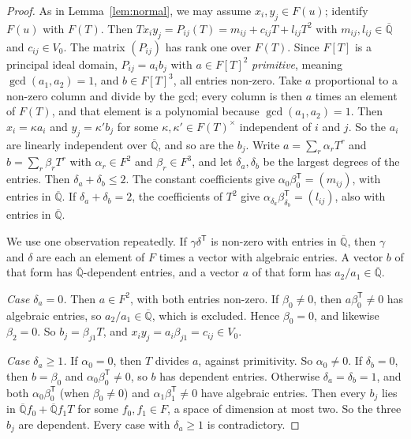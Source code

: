 \documentclass[11pt,a4paper]{article}
\theoremstyle{plain}
\theoremstyle{definition}
\newcommand{\Qbar}{\overline{\mathbb{Q}}}
\begin{document}
\begin{proof}
As in Lemma~\ref{lem:normal}, we may assume $x_{i},y_{j}\in F(u)$; identify $F(u)$ with
$F(T)$. Then $Tx_{i}y_{j}=P_{ij}(T)=m_{ij}+c_{ij}T+l_{ij}T^{2}$ with $m_{ij},l_{ij}\in\Qbar$
and $c_{ij}\in V_{0}$. The matrix $(P_{ij})$ has rank one over $F(T)$. Since $F[T]$ is a
principal ideal domain, $P_{ij}=a_{i}b_{j}$ with $a\in F[T]^{2}$ \emph{primitive}, meaning
$\gcd(a_{1},a_{2})=1$, and $b\in F[T]^{3}$, all entries non-zero. Take $a$ proportional to a
non-zero column and divide by the gcd; every column is then $a$ times an element of
$F(T)$, and that element is a polynomial because $\gcd(a_{1},a_{2})=1$.
Then $x_{i}=\kappa a_{i}$ and $y_{j}=\kappa'b_{j}$ for some $\kappa,\kappa'\in F(T)^{\times}$
independent of $i$ and $j$. So the $a_{i}$ are linearly independent over $\Qbar$, and so
are the $b_{j}$. Write
$a=\sum_{r}\alpha_{r}T^{r}$ and $b=\sum_{r}\beta_{r}T^{r}$ with $\alpha_{r}\in F^{2}$ and
$\beta_{r}\in F^{3}$, and let $\delta_{a},\delta_{b}$ be the largest degrees of the
entries. Then $\delta_{a}+\delta_{b}\le2$. The constant coefficients give
$\alpha_{0}\beta_{0}^{\mathsf T}=(m_{ij})$, with entries in $\Qbar$. If
$\delta_{a}+\delta_{b}=2$, the coefficients of $T^{2}$ give
$\alpha_{\delta_{a}}\beta_{\delta_{b}}^{\mathsf T}=(l_{ij})$, also with entries in $\Qbar$.

We use one observation repeatedly. If $\gamma\delta^{\mathsf T}$ is non-zero with entries
in $\Qbar$, then $\gamma$ and $\delta$ are each an element of $F$ times a vector with
algebraic entries. A vector $b$ of that form has $\Qbar$-dependent entries, and a vector
$a$ of that form has $a_{2}/a_{1}\in\Qbar$.

\emph{Case $\delta_{a}=0$.} Then $a\in F^{2}$, with both entries non-zero. If
$\beta_{0}\neq0$, then $a\beta_{0}^{\mathsf T}\neq0$ has algebraic entries, so
$a_{2}/a_{1}\in\Qbar$, which is excluded. Hence $\beta_{0}=0$, and likewise $\beta_{2}=0$.
So $b_{j}=\beta_{j1}T$, and $x_{i}y_{j}=a_{i}\beta_{j1}=c_{ij}\in V_{0}$.

\emph{Case $\delta_{a}\ge1$.} If $\alpha_{0}=0$, then $T$ divides $a$, against
primitivity. So $\alpha_{0}\neq0$. If $\delta_{b}=0$, then $b=\beta_{0}$ and
$\alpha_{0}\beta_{0}^{\mathsf T}\neq0$, so $b$ has dependent entries. Otherwise
$\delta_{a}=\delta_{b}=1$, and both $\alpha_{0}\beta_{0}^{\mathsf T}$ (when $\beta_{0}\neq0$)
and $\alpha_{1}\beta_{1}^{\mathsf T}\neq0$ have algebraic entries. Then every $b_{j}$ lies
in $\Qbar f_{0}+\Qbar f_{1}T$ for some $f_{0},f_{1}\in F$, a space of dimension at most two.
So the three $b_{j}$ are dependent. Every case with $\delta_{a}\ge1$ is contradictory.
\end{proof}
\end{document}
